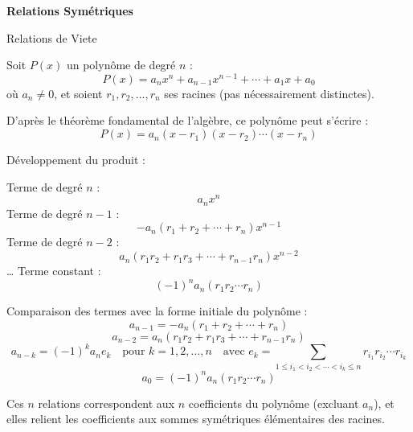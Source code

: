 \documentclass[10pt,a4paper]{article}
\begin{document}
\bigskip
\textbf{Relations Symétriques}

\q Relations de Viete

Soit $P(x)$ un polynôme de degré $n$ :
$$P(x) = a_nx^n + a_{n-1}x^{n-1} + \cdots + a_1x + a_0$$
où $a_n \neq 0$, et soient $r_1, r_2, \ldots, r_n$ ses racines (pas nécessairement distinctes).

D'après le théorème fondamental de l'algèbre, ce polynôme peut s'écrire :
$$P(x) = a_n(x-r_1)(x-r_2)\cdots(x-r_n)$$

Développement du produit :

Terme de degré $n$ : $$a_nx^n$$
Terme de degré $n-1$ : $$-a_n(r_1 + r_2 + \cdots + r_n)x^{n-1}$$
Terme de degré $n-2$ : $$a_n(r_1r_2 + r_1r_3 + \cdots + r_{n-1}r_n)x^{n-2}$$
\dots
Terme constant : $$(-1)^na_n(r_1r_2\cdots r_n)$$

Comparaison des termes avec la forme initiale du polynôme :
$$a_{n-1} = -a_n(r_1 + r_2 + \cdots + r_n)$$
$$a_{n-2} = a_n(r_1r_2 + r_1r_3 + \cdots + r_{n-1}r_n)$$
$$a_{n-k} = (-1)^ka_ne_k \quad \text{pour } k = 1, 2, \ldots, n \quad \text{avec } e_k = \sum_{1\leq
i_1<i_2<\cdots<i_k\leq n} r_{i_1}r_{i_2}\cdots r_{i_k}$$
$$a_0 = (-1)^na_n(r_1r_2\cdots r_n)$$

Ces $n$ relations correspondent aux $n$ coefficients du polynôme (excluant $a_n$), et elles relient
les coefficients aux sommes symétriques élémentaires des racines.
\end{document}
